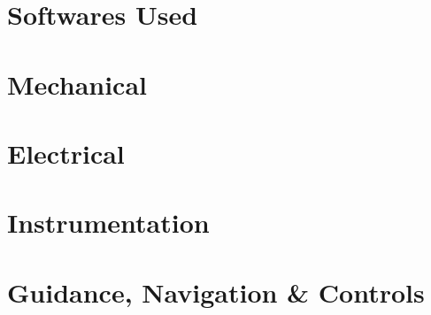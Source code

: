 \documentclass[../../main.tex]{subfiles}
\begin{document}
\section{Softwares Used}
\thispagestyle{fancy}

\section*{Mechanical}
\blindtext

\section*{Electrical}
\blindtext

\section*{Instrumentation}
\blindtext

\section*{Guidance, Navigation \& Controls}
\blindtext
\end{document}
